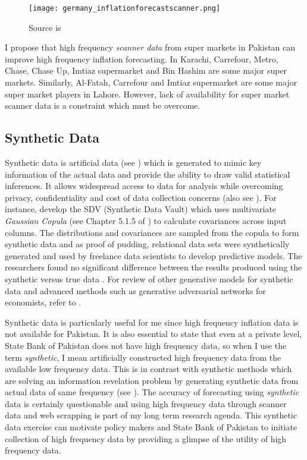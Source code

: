 \documentclass[12pt]{article}
\newcommand{\1}{\mathbbm 1}
\begin{document}
		
		
		\begin{figure}[H]
			\begin{Center}
				\texttt{[image: germany\_inflationforecastscanner.png]}
				\caption{Source is \cite{beck2022}}
			\end{Center}
		\end{figure}
		
		
		I propose that high frequency \textit{scanner data} from super markets in Pakistan can improve high frequency inflation forecasting. In Karachi, Carrefour, Metro, Chase, Chase Up, Imtiaz supermarket and Bin Hashim are some major super markets. Similarly, Al-Fatah, Carrefour and Imtiaz supermarket are some major super market players in Lahore. However, lack of availability for super market scanner data is a constraint which must be overcome. 
		
		\subsection{Synthetic Data}
		
		
		Synthetic data is artificial data (see \cite{nikolenko2021synthetic}) which is generated to mimic key information of the actual data and provide the ability to draw valid statistical inferences. It allows widespread access to data for analysis while overcoming privacy, confidentiality and cost of data collection concerns (also see \cite{raghunathan2021synthetic}). For instance, \cite{patki2016synthetic} develop the SDV (Synthetic Data Vault) which uses multivariate \textit{Gaussian Copula} (see Chapter 5.1.5 of \cite{stachurski2016primer}) to calculate covariances across input columns. The distributions and covariances are sampled from the copula to form synthetic data and as proof of pudding, relational data sets were synthetically generated and used by freelance data scientists to develop predictive models. The researchers found no significant difference between the results produced using the synthetic versus true data \cite{patki2016synthetic}. For review of other generative models for synthetic data and advanced methods such as generative adversarial networks for economists, refer to \cite{koenecke2020synthetic}.
		
		Synthetic data is particularly useful for me since high frequency inflation data is not available for Pakistan. It is also essential to state that even at a private level, State Bank of Pakistan does not have high frequency data, so when I use the term \textit{synthetic}, I mean artificially constructed high frequency data from the available low frequency data. This is in contrast with synthetic methods which are solving an information revelation problem by generating synthetic data from actual data of same frequency (see \cite{patki2016synthetic}). The accuracy of forecasting using \textit{synthetic} data is certainly questionable and using high frequency data through scanner data and web scrapping is part of my long term research agenda. This synthetic data exercise can motivate policy makers and State Bank of Pakistan to initiate collection of high frequency data by providing a glimpse of the utility of high frequency data.
		
\end{document}

